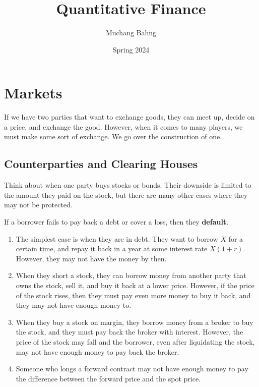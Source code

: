 \documentclass{article}
\begin{document}
\title{Quantitative Finance}
\author{Muchang Bahng}
\date{Spring 2024}

\maketitle
\tableofcontents
\pagebreak


\section{Markets}

  If we have two parties that want to exchange goods, they can meet up, decide on a price, and exchange the good. However, when it comes to many players, we must make some sort of exchange. We go over the construction of one. 

  \subsection{Counterparties and Clearing Houses}

    Think about when one party buys stocks or bonds. Their downside is limited to the amount they paid on the stock, but there are many other cases where they may not be protected. 

    \begin{definition}[Default]
      If a borrower fails to pay back a debt or cover a loss, then they \textbf{default}. 
    \end{definition}

    \begin{example}
      \begin{enumerate}
        \item The simplest case is when they are in debt. They want to borrow $X$ for a certain time, and repay it back in a year at some interest rate $X (1 + r)$. However, they may not have the money by then. 
        \item When they short a stock, they can borrow money from another party that owns the stock, sell it, and buy it back at a lower price. However, if the price of the stock rises, then they must pay even more money to buy it back, and they may not have enough money to. 
        \item When they buy a stock on margin, they borrow money from a broker to buy the stock, and they must pay back the broker with interest. However, the price of the stock may fall and the borrower, even after liquidating the stock, may not have enough money to pay back the broker.
        \item Someone who longs a forward contract may not have enough money to pay the difference between the forward price and the spot price.
      \end{enumerate}
    \end{example}
\end{document}
